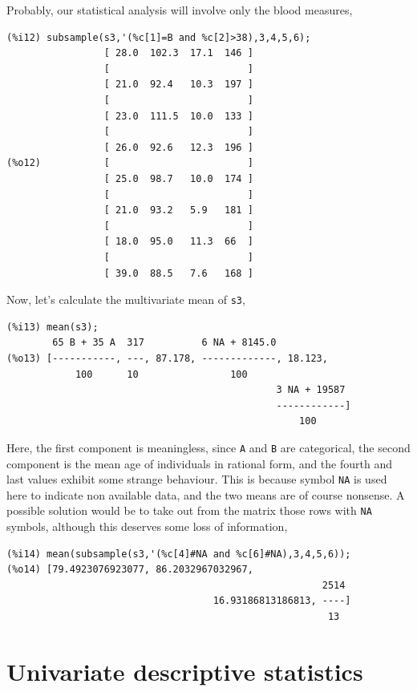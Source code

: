 \documentclass[12pt,a4paper]{article}
\begin{document}
\begin{description}
Probably, our statistical analysis will involve only the blood measures,
\begin{verbatim}
(%i12) subsample(s3,'(%c[1]=B and %c[2]>38),3,4,5,6);
                 [ 28.0  102.3  17.1  146 ]
                 [                        ]
                 [ 21.0  92.4   10.3  197 ]
                 [                        ]
                 [ 23.0  111.5  10.0  133 ]
                 [                        ]
                 [ 26.0  92.6   12.3  196 ]
(%o12)           [                        ]
                 [ 25.0  98.7   10.0  174 ]
                 [                        ]
                 [ 21.0  93.2   5.9   181 ]
                 [                        ]
                 [ 18.0  95.0   11.3  66  ]
                 [                        ]
                 [ 39.0  88.5   7.6   168 ]
\end{verbatim}


Now, let's calculate the multivariate mean of \verb|s3|,
\begin{verbatim}
(%i13) mean(s3);
        65 B + 35 A  317          6 NA + 8145.0
(%o13) [-----------, ---, 87.178, -------------, 18.123,
            100      10                100
                                               3 NA + 19587
                                               ------------]
                                                   100
\end{verbatim}
Here, the first component is meaningless, since \verb|A| and \verb|B| are categorical, the second component is the mean age of individuals in rational form, and the fourth and last values exhibit some strange behaviour. This is because symbol \verb|NA| is used here to indicate non available data, and the two means are of course nonsense. A possible solution would be to take out from the matrix those rows with \verb|NA| symbols, although this deserves some loss of information,
\begin{verbatim}
(%i14) mean(subsample(s3,'(%c[4]#NA and %c[6]#NA),3,4,5,6));
(%o14) [79.4923076923077, 86.2032967032967,
                                                       2514
                                    16.93186813186813, ----]
                                                        13
\end{verbatim}


\end{description}


\section{Univariate descriptive statistics}
\end{document}
